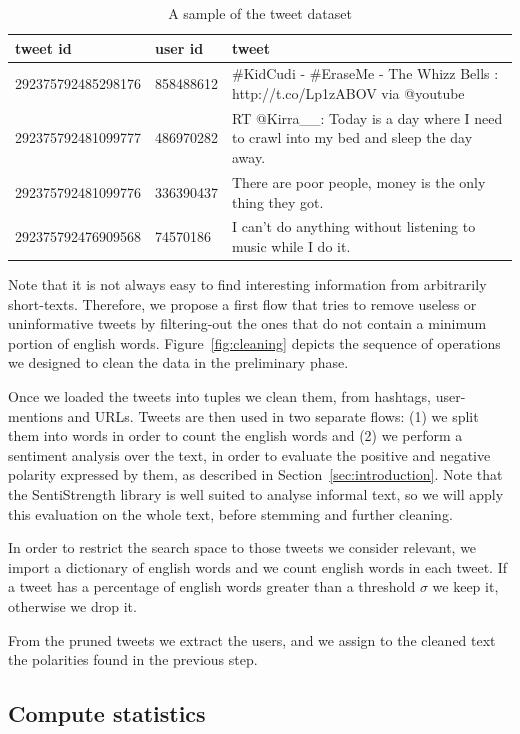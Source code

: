 \begin{table}[!t]
\begin{tabular}{|l|l|l|}
\hline
tweet id & user id & tweet\\
\hline
292375792485298176&858488612& \#KidCudi - \#EraseMe - The Whizz Bells : http://t.co/Lp1zABOV via @youtube\\
292375792481099777&486970282& RT @Kirra\_\_: Today is a day where I need to crawl into my bed and sleep the day away.\\
292375792481099776&336390437& There are poor people, money is the only thing they got.\\
292375792476909568&74570186& I can't do anything without listening to music while I do it.\\
\hline
\end{tabular}
\caption{A sample of the tweet dataset}
\label{tbl:tweets}
\end{table}

Note that it is not always easy to find interesting information from arbitrarily short-texts.
Therefore, we propose a first flow that tries to remove useless or uninformative tweets by filtering-out the ones that do not contain a minimum portion of english words. 
Figure~\ref{fig:cleaning} depicts the sequence of operations we designed to clean the data in the preliminary phase. 

Once we loaded the tweets into tuples we clean them, from hashtags, user-mentions and URLs. 
Tweets are then used in two separate flows: (1) we split them into words in order to count the english words and (2) we perform a sentiment analysis over the text, in order to evaluate the positive and negative polarity expressed by them, as described in Section~\ref{sec:introduction}.
Note that the SentiStrength library is well suited to analyse informal text, so we will apply this evaluation on the whole text, before stemming and further cleaning. 

In order to restrict the search space to those tweets we consider relevant, we import a dictionary of english words and we count english words in each tweet. 
If a tweet has a percentage of english words greater than a threshold $\sigma$ we keep it, otherwise we drop it. 

From the pruned tweets we extract the users, and we assign to the cleaned text the polarities found in the previous step. 


\subsection{Compute statistics}
\label{sec:statistics}

